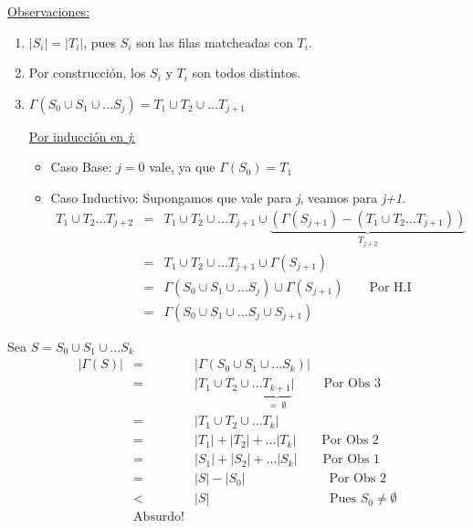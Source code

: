 \documentclass[12pt,a4paper]{report}
\newcounter{neq}
\begin{document}
			\vspace{5mm}
			\underline{Observaciones:}
			\begin{enumerate}
				\item $\lvert S_{i} \rvert = \lvert T_{i} \rvert$, pues $S_{i}$ son las filas matcheadas con $T_{i}$.
				\item Por construcción, los $S_{i}$ y $T_{i}$ son todos distintos.
				\item $\Gamma(S_{0} \cup S_{1} \cup \dotsc S_{j}) = T_{1} \cup T_{2} \cup \dotsc T_{j+1}$
					\par \underline{Por inducción en \textit{j}:}
						\begin{itemize}
							\item Caso Base: $j = 0$ vale, ya que $\Gamma(S_{0}) = T_{1}$
							\item Caso Inductivo: Supongamos que vale para \textit{j}, veamos para \textit{j+1}.
								\begin{eqnarray}
									\nonumber T_{1} \cup T_{2} \dotsc T_{j + 2} &=& T_{1} \cup T_{2} \cup \dotsc T_{j + 1} \cup \underbrace{(\Gamma(S_{j + 1}) - (T_{1} \cup T_{2} \dotsc T_{j + 1}))}_{T_{j + 2}} \\
									\nonumber &=& T_{1} \cup T_{2} \cup \dotsc T_{j + 1} \cup \Gamma(S_{j + 1}) \\
									\nonumber &=& \Gamma(S_{0} \cup S_{1} \cup \dotsc S_{j}) \cup \Gamma(S_{j + 1}) \qquad \text{Por H.I} \\
									\nonumber &=& \Gamma(S_{0} \cup S_{1} \cup \dotsc S_{j} \cup S_{j + 1})
								\end{eqnarray}
						\end{itemize}
			\end{enumerate}

			\par Sea $S = S_{0} \cup S_{1} \cup \dotsc S_{k}$
				\begin{eqnarray}
					\nonumber \lvert \Gamma(S) \rvert &=& \lvert \Gamma(S_{0} \cup S_{1} \cup \dotsc S_{k}) \rvert \\
					\nonumber &=& \lvert T_{1} \cup T_{2} \cup \dotsc \underbrace{T_{k+1}}_{= \; \emptyset} \rvert \qquad \; \text{Por Obs 3} \\
					\nonumber &=& \lvert T_{1} \cup T_{2} \cup \dotsc T_{k} \rvert \\
					\nonumber &=& \lvert T_{1} \rvert + \lvert T_{2} \rvert + \dotsc \lvert T_{k} \rvert \qquad \text{Por Obs 2} \\
					\nonumber &=& \lvert S_{1} \rvert + \lvert S_{2} \rvert + \dotsc \lvert S_{k} \rvert \qquad \text{Por Obs 1} \\
					\nonumber &=& \lvert S \rvert - \lvert S_{0} \rvert \qquad \qquad \qquad \; \; \text{Por Obs 2} \\
					\nonumber &<& \lvert S \rvert \qquad \qquad \qquad \qquad \; \; \; \; \;\text{Pues } S_{0} \neq \emptyset \\
					\nonumber & \text{Absurdo!} &
				\end{eqnarray}
\end{document}

